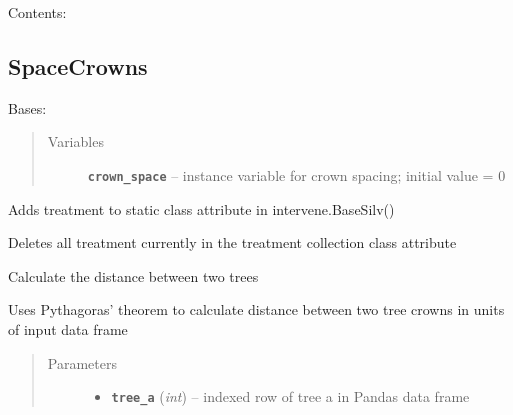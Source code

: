 \documentclass[letterpaper,10pt,english]{sphinxmanual}
\begin{document}
Contents:


\subsection{SpaceCrowns}
\label{SpaceCrowns:spacecrowns}\label{SpaceCrowns::doc}

\begin{fulllineitems}
\label{SpaceCrowns:intervene.SpaceCrowns}
Bases: 
\begin{quote}\begin{description}
\item[{Variables}] \leavevmode
\textbf{\texttt{crown\_space}} -- instance variable for crown spacing; initial value = 0

\end{description}\end{quote}

\begin{fulllineitems}
\label{SpaceCrowns:intervene.SpaceCrowns.add_to_treatment_collection}
Adds treatment to static class attribute in intervene.BaseSilv()

\end{fulllineitems}


\begin{fulllineitems}
\label{SpaceCrowns:intervene.SpaceCrowns.clear_treatment_collection}
Deletes all treatment currently in the treatment collection class
attribute

\end{fulllineitems}


\begin{fulllineitems}
\label{SpaceCrowns:intervene.SpaceCrowns.get_distance}
Calculate the distance between two trees

Uses Pythagoras' theorem to calculate distance between two tree crowns
in units of input data frame
\begin{quote}\begin{description}
\item[{Parameters}] \leavevmode\begin{itemize}
\item {} 
\textbf{\texttt{tree\_a}} (\emph{int}) -- indexed row of tree a in Pandas data frame


\end{itemize}
\end{description}
\end{quote}
\end{fulllineitems}
\end{fulllineitems}
\end{document}
